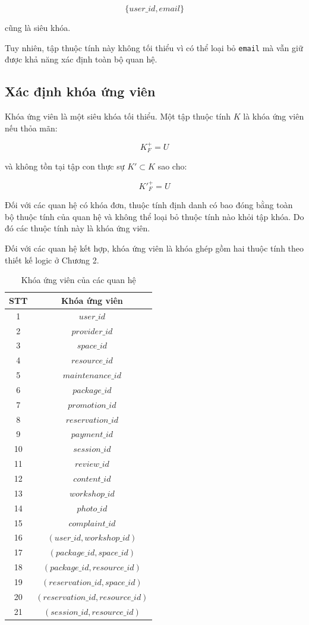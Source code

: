 \[
\{user\_id,email\}
\]

cũng là siêu khóa.

Tuy nhiên, tập thuộc tính này không tối thiểu vì có thể loại bỏ
\texttt{email} mà vẫn giữ được khả năng xác định toàn bộ quan hệ.

\subsection{Xác định khóa ứng viên}

Khóa ứng viên là một siêu khóa tối thiểu. Một tập thuộc tính $K$ là khóa
ứng viên nếu thỏa mãn:

\[
K^+_F = U
\]

và không tồn tại tập con thực sự $K' \subset K$ sao cho:

\[
K'^+_F = U
\]

Đối với các quan hệ có khóa đơn, thuộc tính định danh có bao đóng bằng toàn
bộ thuộc tính của quan hệ và không thể loại bỏ thuộc tính nào khỏi tập khóa.
Do đó các thuộc tính này là khóa ứng viên.

Đối với các quan hệ kết hợp, khóa ứng viên là khóa ghép gồm hai thuộc tính
theo thiết kế logic ở Chương 2.

\begin{table}[htbp]
	\centering
	\begin{tabular}{|c|c|}
		\hline
		\textbf{STT} & \textbf{Khóa ứng viên} \\
		\hline
		1 & $user\_id$ \\
		\hline
		2 & $provider\_id$ \\
		\hline
		3 & $space\_id$ \\
		\hline
		4 & $resource\_id$ \\
		\hline
		5 & $maintenance\_id$ \\
		\hline
		6 & $package\_id$ \\
		\hline
		7 & $promotion\_id$ \\
		\hline
		8 & $reservation\_id$ \\
		\hline
		9 & $payment\_id$ \\
		\hline
		10 & $session\_id$ \\
		\hline
		11 & $review\_id$ \\
		\hline
		12 & $content\_id$ \\
		\hline
		13 & $workshop\_id$ \\
		\hline
		14 & $photo\_id$ \\
		\hline
		15 & $complaint\_id$ \\
		\hline
		16 & $(user\_id,workshop\_id)$ \\
		\hline
		17 & $(package\_id,space\_id)$ \\
		\hline
		18 & $(package\_id,resource\_id)$ \\
		\hline
		19 & $(reservation\_id,space\_id)$ \\
		\hline
		20 & $(reservation\_id,resource\_id)$ \\
		\hline
		21 & $(session\_id,resource\_id)$ \\
		\hline
	\end{tabular}
	\caption{Khóa ứng viên của các quan hệ}
\end{table}

